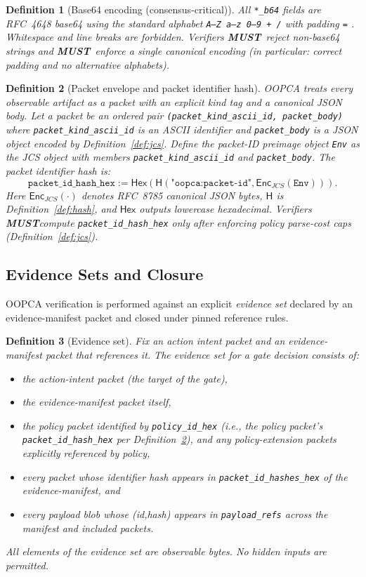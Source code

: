 \documentclass[11pt]{article}
\newcommand{\MUST}{\textbf{MUST}}
\newcommand{\Hash}{\mathsf{H}}
\newcommand{\Enc}{\mathsf{Enc}}
\newcommand{\Hex}{\mathsf{Hex}}
\newtheorem{definition}{Definition}
\begin{document}
\begin{definition}[Base64 encoding (consensus-critical)]\label{def:b64}
All \texttt{*\_b64} fields are RFC~4648 base64 using the standard alphabet \texttt{A--Z a--z 0--9 + /} with padding \texttt{=} \cite{RFC4648}.
Whitespace and line breaks are forbidden.
Verifiers \MUST\ reject non-base64 strings and \MUST\ enforce a single canonical encoding (in particular: correct padding and no alternative alphabets).
\end{definition}
\begin{definition}[Packet envelope and packet identifier hash]\label{def:packetid}
OOPCA treats every observable artifact as a \emph{packet} with an explicit kind tag and a canonical JSON body.
Let a packet be an ordered pair \texttt{(packet\_kind\_ascii\_id, packet\_body)} where \texttt{packet\_kind\_ascii\_id} is an ASCII identifier and \texttt{packet\_body} is a JSON object encoded by Definition~\ref{def:jcs}.
Define the packet-ID preimage object \texttt{Env} as the JCS object with members \texttt{packet\_kind\_ascii\_id} and \texttt{packet\_body}.
The packet identifier hash is:
\[
\texttt{packet\_id\_hash\_hex} := \Hex(\Hash(\texttt{"oopca:packet-id"}, \Enc_{JCS}(\texttt{Env}))).
\]
Here $\Enc_{JCS}(\cdot)$ denotes RFC~8785 canonical JSON bytes, $\Hash$ is Definition~\ref{def:hash}, and $\Hex$ outputs lowercase hexadecimal.
Verifiers \MUST compute \texttt{packet\_id\_hash\_hex} only after enforcing policy parse-cost caps (Definition~\ref{def:jcs}).
\end{definition}
\subsection{Evidence Sets and Closure}\label{sec:evidence}
OOPCA verification is performed against an explicit \emph{evidence set} declared by an evidence-manifest packet and closed under pinned reference rules.

\begin{definition}[Evidence set]\label{def:evidence}
Fix an action intent packet and an evidence-manifest packet that references it.
The evidence set for a gate decision consists of:
\begin{itemize}[leftmargin=1.2em]
\item the action-intent packet (the target of the gate),
\item the evidence-manifest packet itself,
\item the policy packet identified by \texttt{policy\_id\_hex} (i.e., the policy packet's \texttt{packet\_id\_hash\_hex} per Definition~\ref{def:packetid}), and any policy-extension packets explicitly referenced by policy,
\item every packet whose identifier hash appears in \texttt{packet\_id\_hashes\_hex} of the evidence-manifest, and
\item every payload blob whose (id,hash) appears in \texttt{payload\_refs} across the manifest and included packets.
\end{itemize}
All elements of the evidence set are observable bytes. No hidden inputs are permitted.
\end{definition}
\end{document}
